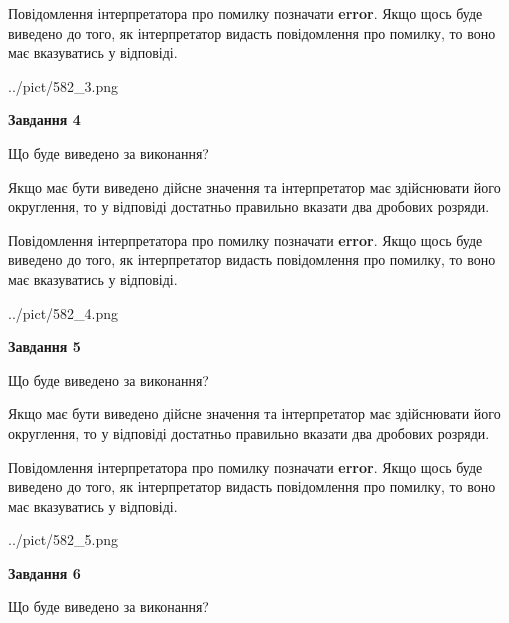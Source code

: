 \documentclass[12pt, ukrainian]{article}
\begin{document}
{\begin {Large}
Повідомлення інтерпретатора про помилку позначати \textbf{error}.
Якщо щось буде виведено до того, як інтерпретатор видасть повідомлення про помилку, 
то воно має вказуватись у відповіді. \par

\begin{center}
	{../pict/582_3.png}
\end{center}
\newpage

{\begin {center}\textbf{Завдання 4}\end {center}}\par
Що буде виведено за виконання? \par

Якщо має бути виведено дійсне значення та інтерпретатор має здійснювати його округлення, 
то у відповіді достатньо правильно вказати два дробових розряди.

Повідомлення інтерпретатора про помилку позначати \textbf{error}.
Якщо щось буде виведено до того, як інтерпретатор видасть повідомлення про помилку, 
то воно має вказуватись у відповіді. \par

\begin{center}
	{../pict/582_4.png}
\end{center}
\newpage

{\begin {center}\textbf{Завдання 5}\end {center}}\par
Що буде виведено за виконання? \par

Якщо має бути виведено дійсне значення та інтерпретатор має здійснювати його округлення, 
то у відповіді достатньо правильно вказати два дробових розряди.

Повідомлення інтерпретатора про помилку позначати \textbf{error}.
Якщо щось буде виведено до того, як інтерпретатор видасть повідомлення про помилку, 
то воно має вказуватись у відповіді. \par

\begin{center}
	{../pict/582_5.png}
\end{center}
\newpage

{\begin {center}\textbf{Завдання 6}\end {center}}\par
Що буде виведено за виконання? \par


\end{Large}}
\end{document}
